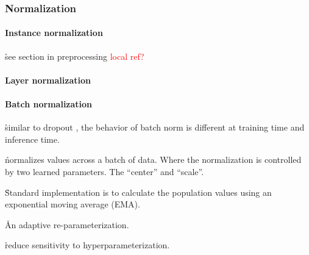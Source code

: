 \subsubsection{Normalization}



\paragraph{Instance normalization}

\r{see section in preprocessing \textcolor{red}{local ref?}}

\paragraph{Layer normalization}


\paragraph{Batch normalization}



\r{similar to dropout \ALR, the behavior of batch norm is different at training time and inference time.}

\r{normalizes values across a batch of data. Where the normalization is controlled by two learned parameters. The ``center'' and ``scale''.}

\r{Standard implementation is to calculate the population values using an exponential moving average (EMA).}



\r{An adaptive re-parameterization.}

\r{reduce sensitivity to hyperparameterization.}


